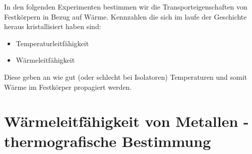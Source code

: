 \documentclass[12pt,a4paper]{article}
\begin{document}
\begin{multicols}{2}




%			


\noindent In den folgenden Experimenten bestimmen wir die Transporteigenschaften von Festkörpern in Bezug auf Wärme. Kennzahlen die sich im laufe der Geschichte heraus kristallisiert haben sind:\\
\begin{itemize}
	\item Temperaturleitfähigkeit
	\item Wärmeleitfähigkeit
\end{itemize}
Diese geben an wie gut (oder schlecht bei Isolatoren) Temperaturen und somit Wärme im Festkörper propagiert werden.

\section{Wärmeleitfähigkeit von Metallen - thermografische Bestimmung}


\end{multicols}
\end{document}
